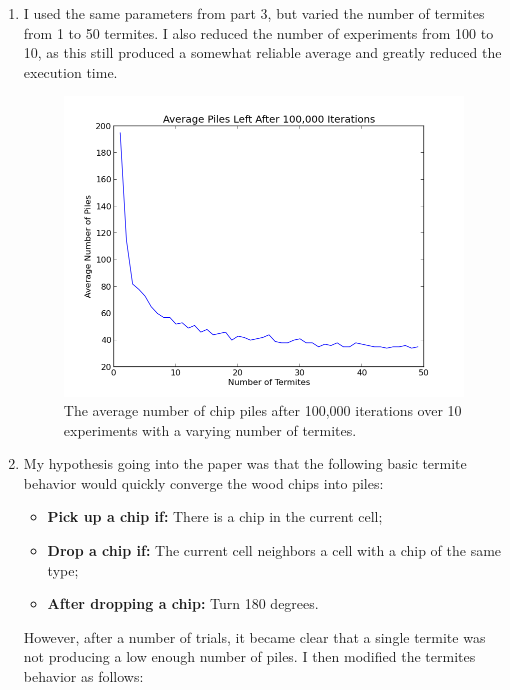 \documentclass{article}
\begin{document}
\begin{enumerate}
\item{} %

I used the same parameters from part 3, but varied the number of termites from 1
to 50 termites. I also reduced the number of experiments from 100 to 10, as this
still produced a somewhat reliable average and greatly reduced the execution
time.

\begin{figure}[H]
\centering
\label{multiple}
\includegraphics[width=\textwidth]{figs/part_5.png}
\caption{The average number of chip piles after 100,000 iterations over 10
experiments with a varying number of termites.}
\end{figure}

\item{} %

My hypothesis going into the paper was that the following basic termite behavior
would quickly converge the wood chips into piles:

\begin{itemize}
    \item \textbf{Pick up a chip if:} There is a chip in the current cell;
    \item \textbf{Drop a chip if:} The current cell neighbors a cell with a chip
    of the same type;
    \item \textbf{After dropping a chip:} Turn 180 degrees.
\end{itemize}

However, after a number of trials, it became clear that a single termite was not
producing a low enough number of piles. I then modified the termites behavior as
follows:


\end{enumerate}
\end{document}
